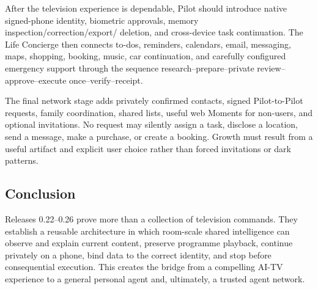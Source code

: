 After the television experience is dependable, Pilot should introduce native
signed-phone identity, biometric approvals, memory inspection/correction/export/
deletion, and cross-device task continuation.  The Life Concierge then connects
to-dos, reminders, calendars, email, messaging, maps, shopping, booking, music,
car continuation, and carefully configured emergency support through the
sequence research--prepare--private review--approve--execute once--verify--receipt.

The final network stage adds privately confirmed contacts, signed Pilot-to-Pilot
requests, family coordination, shared lists, useful web Moments for non-users,
and optional invitations.  No request may silently assign a task, disclose a
location, send a message, make a purchase, or create a booking.  Growth must
result from a useful artifact and explicit user choice rather than forced
invitations or dark patterns.

\subsection{Conclusion}

Releases 0.22--0.26 prove more than a collection of television commands.  They
establish a reusable architecture in which room-scale shared intelligence can
observe and explain current content, preserve programme playback, continue
privately on a phone, bind data to the correct identity, and stop before
consequential execution.  This creates the bridge from a compelling AI-TV
experience to a general personal agent and, ultimately, a trusted agent network.
